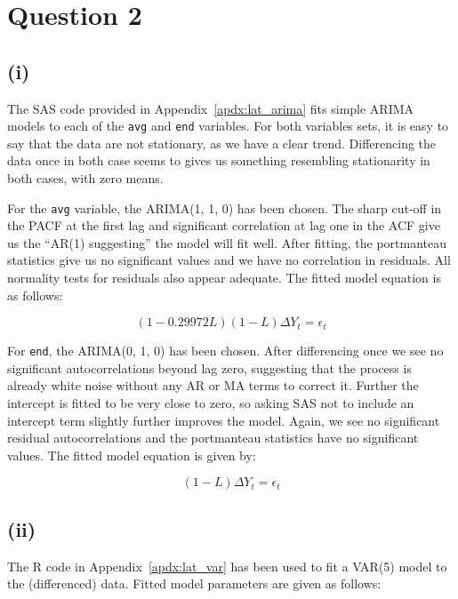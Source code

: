 \documentclass{article}
\begin{document}
\section*{Question 2}

\subsection*{(i)}

The SAS code provided in Appendix~\ref{apdx:lat_arima} fits simple
ARIMA models to each of the \texttt{avg} and \texttt{end}
variables. For both variables sets, it is easy to say that the data
are not stationary, as we have a clear trend. Differencing the data
once in both case seems to gives us something resembling stationarity
in both cases, with zero means.

For the \texttt{avg} variable, the ARIMA(1, 1, 0) has been chosen. The
sharp cut-off in the PACF at the first lag and significant correlation
at lag one in the ACF give us the ``AR(1) suggesting'' the model will
fit well. After fitting, the portmanteau statistics give us no
significant values and we have no correlation in residuals. All
normality tests for residuals also appear adequate. The fitted model
equation is as follows:

\[
  (1 - 0.29972L) (1 - L) \Delta Y_t = \epsilon_t
\]

For \texttt{end}, the ARIMA(0, 1, 0) has been chosen. After
differencing once we see no significant autocorrelations beyond lag
zero, suggesting that the process is already white noise without any
AR or MA terms to correct it. Further the intercept is fitted to be
very close to zero, so asking SAS not to include an intercept term
slightly further improves the model. Again, we see no significant
residual autocorrelations and the portmanteau statistics have no
significant values. The fitted model equation is given by:

\[
  (1 - L) \Delta Y_t = \epsilon_t
\]

\subsection*{(ii)}

The R code in Appendix~\ref{apdx:lat_var} has been used to fit a
VAR(5) model to the (differenced) data. Fitted model parameters are
given as follows:
\end{document}
